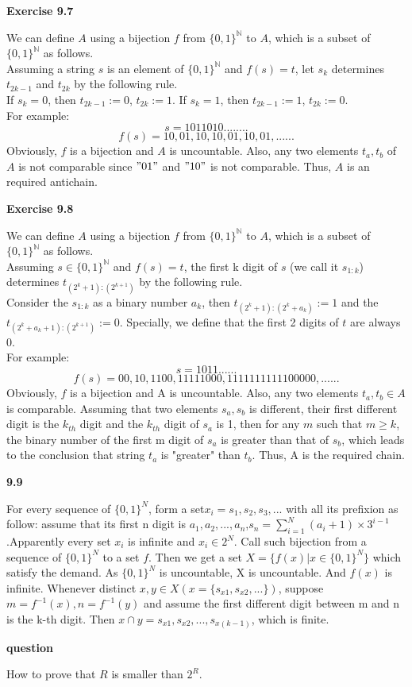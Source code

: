 \documentclass{article} %
\begin{document}
	\textbf{Exercise 9.7}\par
    	We can define $A$ using a bijection $f$ from ${\{0,1\}}^{\mathbb{N}}$ to $A$, which is a subset of ${\{0,1\}}^{\mathbb{N}}$ as follows.\\
	Assuming a string $s$ is an element of ${\{0,1\}}^{\mathbb{N}}$ and $f(s)=t$, let $s_k$ determines $t_{2k-1}$ and $t_{2k}$ by the following rule.\\
	If $s_k=0$, then $t_{2k-1}:=0$, $t_{2k}:=1$. If $s_k=1$, then $t_{2k-1}:=1$, $t_{2k}:=0$.\\
	For example:\\
	$$
	s=1011010........
	$$
	$$
	f(s)=10,01,10,10,01,10,01,......
	$$
	Obviously, $f$ is a bijection and $A$ is uncountable. Also, any two elements $t_{a},t_{b}$ of $A$ is not comparable since $"01"$ and $"10"$ is not comparable.
	Thus, $A$ is an required antichain.\par
	\textbf{Exercise 9.8}\par
	 We can define $A$ using a bijection $f$ from $\{0,1\}^{\mathbb{N}}$ to $A$, which is a subset of $\{0,1\}^{\mathbb{N}}$ as follows.\\
 Assuming $s\in \{0,1\}^{\mathbb{N}}$ and $f(s)=t$, the first k digit of $s$ (we call it $s_{1:k}$) determines $t_{(2^{k}+1):(2^{k+1})}$ by the following rule.\\
	 
	 	 Consider the $s_{1:k}$ as a binary number $a_k$, then $t_{(2^{k}+1):(2^{k}+a_k)}:=1$ and the $t_{(2^{k}+a_k+1):(2^{k+1})}:=0$. Specially, we define that the first 2 digits of $t$ are always $0$.\\  
	 
	 For example:\\
	 $$
	 s=1011......
	 $$
	 $$
	 f(s)=00,10,1100,11111000,1111111111100000,......
	 $$
	 Obviously, $f$ is a bijection and A is uncountable. Also, any two elements $t_a,t_b\in A$ is comparable. Assuming that two elements $s_a,s_b$ is different, their first different digit is the $k_{th}$ digit and the $k_{th}$ digit of $s_a$ is 1, then for any $m$ such that $m \ge k$, the binary number of the first m digit of $s_a$ is greater than that of $s_b$, which leads to the conclusion that string $t_a$ is "greater" than $t_b$. Thus, A is the required chain. \par

	
  \textbf{9.9}\par
	  For every sequence of $\{0,1\} ^N$, form a set$x_i={s_1,s_2,s_3,...}$ with all its prefixion as follow: assume that its first n digit is $a_1,a_2,...,a_n$,$s_n=\sum_{i=1}^N(a_i+1)\times 3^{i-1}$.Apparently every set $x_i$ is infinite and $x_i\in 2^N$. Call such bijection from a sequence of $\{0,1\}^N$ to a set $f$. Then we get a set $X=\{f(x)|x\in \{0,1\}^N\}$ which satisfy the demand. As $\{0,1\} ^N$ is uncountable, X is uncountable. And $f(x)$ is infinite. Whenever distinct $x,y \in X(x=\{s_{x1},s_{x2},...\})$, suppose $m=f^{-1}(x),n=f^{-1}(y)$ and assume the first different digit between m and n is the k-th digit. Then $x\cap y={s_{x1},s_{x2},...,s_{x(k-1)}}$, which is finite.
	 
		\textbf{question}\par
	 How to prove that $R$ is smaller than $2^R$.
	
\end{document}
